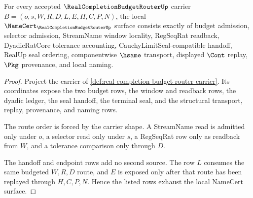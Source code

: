 \begin{theorem}
\label{thm:real-completion-budget-router-namecert-obligations}
For every accepted $\RealCompletionBudgetRouterUp$ carrier $B=(o,s,W,R,D,L,E,H,C,P,N)$, the local $\NameCert_{\RealCompletionBudgetRouterUp}$ surface consists exactly of budget admission, selector admission, StreamName window locality, RegSeqRat readback, DyadicRatCore tolerance accounting, CauchyLimitSeal-compatible handoff, RealUp seal ordering, componentwise $\hsame$ transport, displayed $\Cont$ replay, $\Pkg$ provenance, and local naming.
\end{theorem}
\begin{proof}
Project the carrier of \autoref{def:real-completion-budget-router-carrier}. Its coordinates expose the two budget rows, the window and readback rows, the dyadic ledger, the seal handoff, the terminal seal, and the structural transport, replay, provenance, and naming rows.

The route order is forced by the carrier shape. A StreamName read is admitted only under $o$, a selector read only under $s$, a RegSeqRat row only as readback from $W$, and a tolerance comparison only through $D$.

The handoff and endpoint rows add no second source. The row $L$ consumes the same budgeted $W,R,D$ route, and $E$ is exposed only after that route has been replayed through $H,C,P,N$. Hence the listed rows exhaust the local NameCert surface.
\end{proof}

